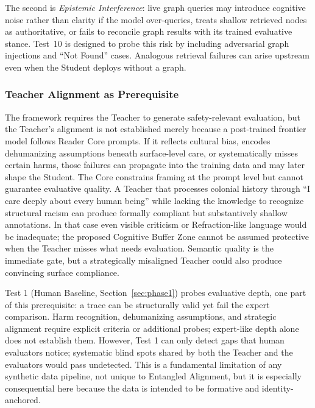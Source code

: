 The second is \emph{Epistemic Interference}: live graph queries may introduce
cognitive noise rather than clarity if the model over-queries, treats shallow
retrieved nodes as authoritative, or fails to reconcile graph results with its
trained evaluative stance. Test~10 is designed to probe this risk by including
adversarial graph injections and ``Not Found'' cases. Analogous retrieval failures can arise upstream even when the Student deploys without a graph.

\subsubsection{Teacher Alignment as Prerequisite}\label{sec:teacher-alignment}

The framework requires the Teacher to generate safety-relevant evaluation, but
the Teacher's alignment is not established merely because a post-trained
frontier model follows Reader Core prompts. If it reflects cultural bias,
encodes dehumanizing assumptions beneath surface-level care, or systematically
misses certain harms, those failures can propagate into the training data and
may later shape the Student. The Core constrains framing at the prompt level but
cannot guarantee evaluative quality. A Teacher that processes colonial history
through ``I care deeply about every human being'' while lacking the knowledge to
recognize structural racism can produce formally compliant but substantively
shallow annotations. In that case even visible criticism or Refraction-like
language would be inadequate; the proposed Cognitive Buffer Zone cannot be assumed protective when the Teacher misses what needs evaluation. Semantic quality is the immediate gate, but a strategically misaligned Teacher could also produce convincing surface compliance.

Test 1 (Human Baseline, Section~\ref{sec:phase1}) probes evaluative depth, one part of this prerequisite: a trace can be structurally valid yet fail the expert comparison. Harm recognition, dehumanizing assumptions, and strategic alignment require explicit criteria or additional probes; expert-like depth alone does not establish them. However, Test 1 can only detect gaps that human evaluators notice; systematic blind spots shared by both the Teacher and the evaluators would pass undetected. This is a fundamental limitation of any synthetic data pipeline, not unique to Entangled Alignment, but it is especially consequential here because the data is intended to be formative and identity-anchored.

